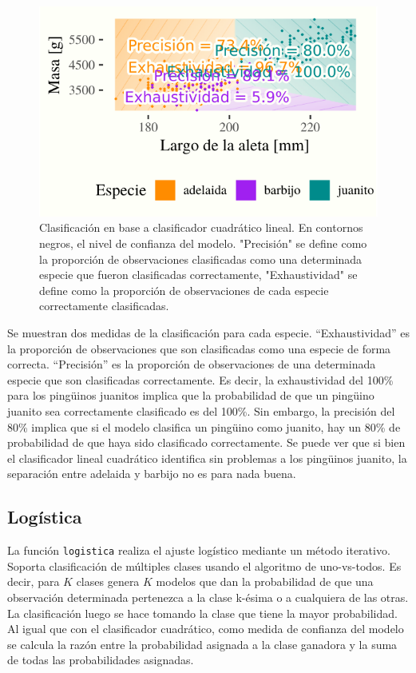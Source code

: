 \documentclass[]{tufte-handout}
\begin{document}
\begin{figure}
\includegraphics{TP-Labo-2_files/figure-latex/cuadratico-1} \caption[Clasificación en base a clasificador cuadrático lineal]{Clasificación en base a clasificador cuadrático lineal. En contornos negros, el nivel de confianza del modelo. "Precisión" se define como la proporción de observaciones clasificadas como una determinada especie que fueron clasificadas correctamente, "Exhaustividad" se define como la proporción de observaciones de cada especie correctamente clasificadas.}\label{fig:cuadratico}
\end{figure}

Se muestran dos medidas de la clasificación para cada especie. ``Exhaustividad'' es la proporción de observaciones que son clasificadas como una especie de forma correcta. ``Precisión'' es la proporción de observaciones de una determinada especie que son clasificadas correctamente. Es decir, la exhaustividad del 100\% para los pingüinos juanitos implica que la probabilidad de que un pingüino juanito sea correctamente clasificado es del 100\%. Sin embargo, la precisión del 80\% implica que si el modelo clasifica un pingüino como juanito, hay un 80\% de probabilidad de que haya sido clasificado correctamente.
Se puede ver que si bien el clasificador lineal cuadrático identifica sin problemas a los pingüinos juanito, la separación entre adelaida y barbijo no es para nada buena.

\hypertarget{loguxedstica}{%
\subsection{Logística}\label{loguxedstica}}

La función \texttt{logistica} realiza el ajuste logístico mediante un método iterativo. Soporta clasificación de múltiples clases usando el algoritmo de uno-vs-todos. Es decir, para \(K\) clases genera \(K\) modelos que dan la probabilidad de que una observación determinada pertenezca a la clase k-ésima o a cualquiera de las otras. La clasificación luego se hace tomando la clase que tiene la mayor probabilidad. Al igual que con el clasificador cuadrático, como medida de confianza del modelo se calcula la razón entre la probabilidad asignada a la clase ganadora y la suma de todas las probabilidades asignadas.
\end{document}
